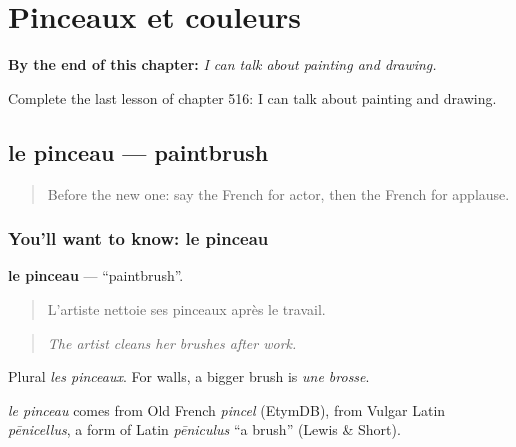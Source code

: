 
\chapter{Pinceaux et couleurs}
\label{ch:fr-pinceaux-et-couleurs}

\begin{chapteropening}
\textbf{By the end of this chapter:} \emph{I can talk about painting and drawing.}

Complete the last lesson of chapter 516: I can talk about painting and drawing.
\end{chapteropening}

\section[le pinceau]{le pinceau — paintbrush}

\label{lesson:FR-C516-pinceau}



\begin{quote}
Before the new one: say the French for actor, then the French for applause.
\end{quote}

\subsection*{You'll want to know: le pinceau}
\textbf{le pinceau} — \textquotedblleft{}paintbrush\textquotedblright{}.

\begin{quote}
L'artiste nettoie ses pinceaux après le travail.
\end{quote}

\begin{quote}
\emph{The artist cleans her brushes after work.}
\end{quote}

Plural \emph{les pinceaux}. For walls, a bigger brush is \emph{une brosse}.

\begin{cousinweb}
\emph{le pinceau} comes from Old French \emph{pincel} (EtymDB), from Vulgar Latin \emph{pēnicellus}, a form of Latin \emph{pēniculus} \textquotedblleft{}a brush\textquotedblright{} (Lewis \& Short).
\end{cousinweb}

